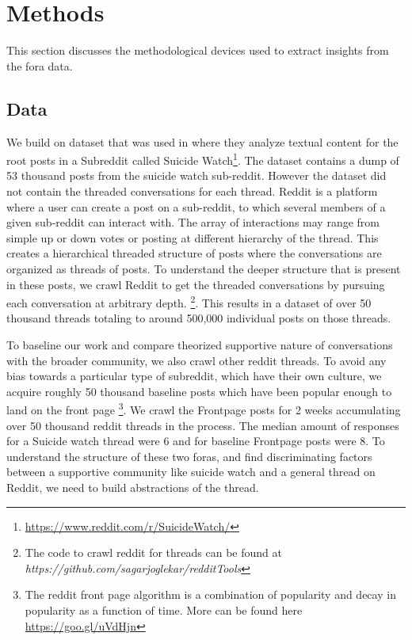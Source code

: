\section{Methods}
This section discusses the methodological devices used to extract insights from the fora data.

\subsection{Data}
We build on dataset that was used in \cite{gkotsis2017characterisation} where they analyze textual content for the root posts in a Subreddit called Suicide Watch\footnote{\url{https://www.reddit.com/r/SuicideWatch/}}. The dataset contains a dump of 53 thousand posts from the suicide watch sub-reddit.
However the dataset did not contain the threaded conversations for each thread. Reddit is a platform where a user can create a post on a sub-reddit, to which several members of a given sub-reddit can interact with. The array of interactions may range from simple up or down votes or posting at different hierarchy of the thread. This creates a hierarchical threaded structure of posts where the conversations are organized as threads of posts. To understand the deeper structure that is present in these posts,  we crawl Reddit to get the threaded conversations by pursuing each conversation at arbitrary depth. \footnote{The code to crawl reddit for threads can be found at \textit{https://github.com/sagarjoglekar/redditTools}}. This results in a dataset of over 50 thousand threads totaling to around 500,000 individual posts on those threads.  

To baseline our work and compare theorized supportive nature of conversations with the broader community, we also crawl other reddit threads. To avoid any bias towards a particular type of subreddit, which have their own culture, we acquire roughly 50 thousand baseline posts which have been popular enough to land on the front page \footnote{The reddit front page algorithm is a combination of popularity and decay in popularity as a function of time. More can be found here \url{https://goo.gl/uVdHjn}}. We crawl the Frontpage posts for 2 weeks accumulating over 50 thousand reddit threads in the process. The median amount of responses for a Suicide watch thread were 6 and for baseline Frontpage posts were 8. 
To understand the structure of these two foras, and find discriminating factors between a supportive community like suicide watch and a general thread on Reddit, we need to build abstractions of the thread. 



